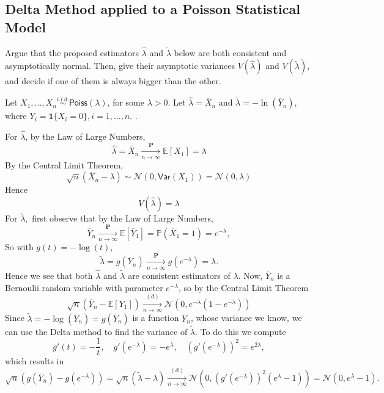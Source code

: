 \documentclass[10pt,landscape]{article}
\begin{document}
\subsection*{Delta Method applied to a Poisson Statistical Model}

Argue that the proposed estimators $\widehat{\lambda }$ and $\widetilde\lambda$ below are both consistent and asymptotically normal. Then, give their asymptotic variances $V(\widehat\lambda )$ and $V(\widetilde\lambda )$, and decide if one of them is always bigger than the other.\newline

Let $X_1,\ldots ,X_ n\stackrel{i.i.d.}{\sim }\textsf{Poiss}(\lambda )$, for some $\lambda > 0$. Let $\widehat\lambda =\overline{X}_n$ and $\widetilde\lambda =-\ln (\overline{Y}_ n)$, where  $Y_ i=\mathbf{1}\{ X_ i=0\} , i=1,\ldots ,n$. \newline.

For $\widehat\lambda$, by the Law of Large Numbers,
$$\widehat\lambda=\overline{X}_ n \xrightarrow [n \to \infty ]{\mathbf{P}} \mathbb E[X_1] = \lambda$$
By the Central Limit Theorem,
$$\sqrt{n} (\overline{X}_ n - \lambda ) \sim \mathcal{N}(0,\textsf{Var}(X_1)) = \mathcal{N}(0,\lambda )$$
Hence 
$$V(\widehat\lambda)=\lambda$$
For $\widetilde \lambda,$ first observe that by the Law of Large Numbers,
$$\overline Y_n\xrightarrow[n\to\infty]{\mathbf{P}}\mathbb{E}[\overline Y_1]=\mathbb{P}(\overline X_1=1)=e^{-\lambda},$$
So with $g(t) = -\log (t)$,
$$\widetilde\lambda = g(\overline{Y}_ n) \xrightarrow [n \to \infty ]{\mathbf{P}} g(e^{-\lambda }) = \lambda .$$
Hence we see that both $\widehat\lambda$ and $\widetilde \lambda$ are consistent estimators of $\lambda$.\newline
Now, $\overline Y_n$ is a Bernoulii random variable with parameter $e^{-\lambda}$, so by the Central Limit Theorem
$$\sqrt{n}(\overline Y_n-\mathbb{E}[Y_1])\xrightarrow[n\to\infty]{(d)}\mathcal{N}\left(0,e^{-\lambda}(1-e^{-\lambda})\right)$$
Since $\widetilde \lambda = -\log (\overline Y_n)=g(\overline Y_n)$ is a function $\overline Y_n$, whose variance we know, we can use the Delta method to find the variance of $\widetilde \lambda$. To do this we compute
$$g'(t) = -\frac{1}{t}, \quad g'(e^ {-\lambda }) = - e^{\lambda},\quad \left(g'(e^ {-\lambda })\right)^2 = e^{2\lambda},$$
which results in
$$\sqrt{n}\left(g(\overline Y_n)-g(e^{-\lambda})\right)=\sqrt{n}(\tilde\lambda - \lambda ) \xrightarrow [n \to \infty ]{\mathrm{(d)}} \mathcal{N}\left(0, \left(g'(e^ {-\lambda })\right)^2 \left(e^{\lambda} - 1\right)\right)=\mathcal{N}(0, e^{\lambda} - 1).$$
\end{document}

